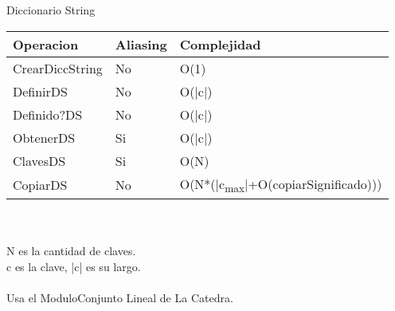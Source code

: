  {\LARGE Diccionario String}\\
 \begin{tabular}[c]{|l|l|l|}
		\hline
		Operacion & Aliasing & Complejidad \\
		\hline
		CrearDiccString & No & O(1) \\
		\hline
		DefinirDS & No & O(|c|)\\
		\hline
		Definido?DS & No & O(|c|)\\
		\hline
		ObtenerDS & Si & O(|c|)\\
		\hline
		ClavesDS & Si & O(N) \\
		\hline
		CopiarDS & No & O(N*(|c\textsubscript{max}|+O(copiarSignificado))) \\
		\hline
		
		
		
	\end{tabular}\\\\

N es la cantidad de claves.\\
c es la clave, |c| es su largo.\\
\\
Usa el Modulo{\LARGE  Conjunto Lineal} de La Catedra. \\


	
\newpage
